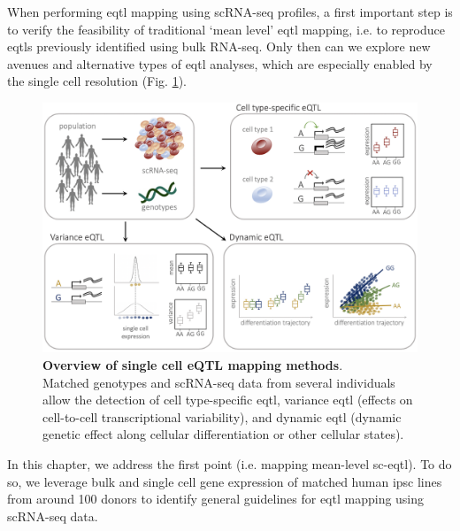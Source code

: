When performing \gls{eqtl} mapping using scRNA-seq profiles, a first important step is to verify the feasibility of traditional `mean level' \gls{eqtl} mapping, i.e. to reproduce \glspl{eqtl} previously identified using bulk RNA-seq.
Only then can we explore new avenues and alternative types of \gls{eqtl} analyses, which are especially enabled by the single cell resolution (Fig. \ref{fig:sc_eqtl}).

\begin{figure}[h]
\centering
\includegraphics[width=14cm]{Chapter3/Fig/sc_eqtl.png}
\caption[Single cell eQTL]{\textbf{Overview of single cell eQTL mapping methods}.\\
Matched genotypes and scRNA-seq data from several individuals allow the detection of cell type-specific \gls{eqtl}, variance \gls{eqtl} (effects on cell-to-cell transcriptional variability), and dynamic \gls{eqtl} (dynamic genetic effect along cellular differentiation or other cellular states).}
\label{fig:sc_eqtl}
\end{figure}

In this chapter, we address the first point (i.e. mapping mean-level sc-\gls{eqtl}).
To do so, we leverage bulk and single cell gene expression of matched human \gls{ipsc} lines from around 100 donors to identify general guidelines for \gls{eqtl} mapping using scRNA-seq data.

